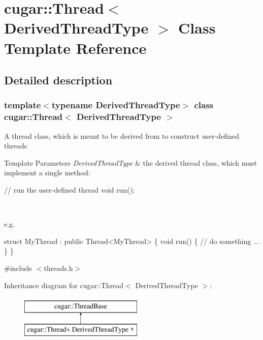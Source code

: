 \hypertarget{classcugar_1_1_thread}{}\section{cugar\+:\+:Thread$<$ Derived\+Thread\+Type $>$ Class Template Reference}
\label{classcugar_1_1_thread}


\subsection{Detailed description}
\subsubsection*{template$<$typename Derived\+Thread\+Type$>$\newline
class cugar\+::\+Thread$<$ Derived\+Thread\+Type $>$}

A thread class, which is meant to be derived from to construct user-\/defined threads


\begin{DoxyTemplParams}{Template Parameters}
{\em Derived\+Thread\+Type} & the derived thread class, which must implement a single method\+: 
\begin{DoxyCode}
\textcolor{comment}{// run the user-defined thread}
\textcolor{keywordtype}{void} run();
\end{DoxyCode}
\\
\hline
\end{DoxyTemplParams}
e.\+g. 
\begin{DoxyCode}
\textcolor{keyword}{struct }MyThread : \textcolor{keyword}{public} Thread<MyThread>
\{
    \textcolor{keywordtype}{void} run()
    \{
       \textcolor{comment}{// do something}
       ...
    \}
\}
\end{DoxyCode}
 

{\ttfamily \#include $<$threads.\+h$>$}

Inheritance diagram for cugar\+:\+:Thread$<$ Derived\+Thread\+Type $>$\+:\begin{figure}[H]
\begin{center}
\leavevmode
\includegraphics[height=2.000000cm]{classcugar_1_1_thread}
\end{center}
\end{figure}
